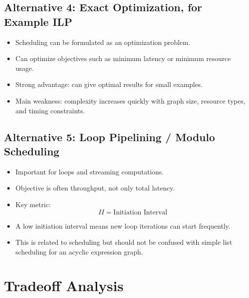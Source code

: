 \documentclass[11pt,a4paper]{article}
\begin{document}
\subsection*{Alternative 4: Exact Optimization, for Example ILP}

\begin{itemize}[leftmargin=*]
    \item Scheduling can be formulated as an optimization problem.
    \item Can optimize objectives such as minimum latency or minimum resource usage.
    \item Strong advantage: can give optimal results for small examples.
    \item Main weakness: complexity increases quickly with graph size, resource types, and timing constraints.
\end{itemize}

\subsection*{Alternative 5: Loop Pipelining / Modulo Scheduling}

\begin{itemize}[leftmargin=*]
    \item Important for loops and streaming computations.
    \item Objective is often throughput, not only total latency.
    \item Key metric:
    \[
    II = \text{Initiation Interval}
    \]
    \item A low initiation interval means new loop iterations can start frequently.
    \item This is related to scheduling but should not be confused with simple list scheduling for an acyclic expression graph.
\end{itemize}

\section{Tradeoff Analysis}
\end{document}
